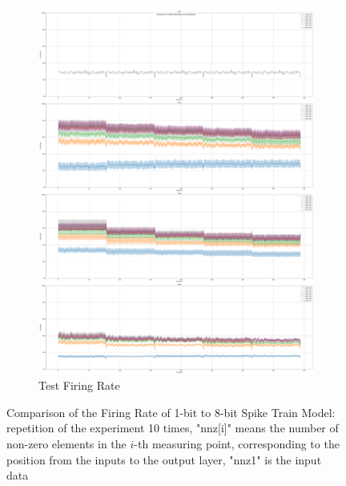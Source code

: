 \begin{figure}[!htpb]
\begin{subfigure}[H]{0.48\textwidth}
                \centering
                \includegraphics[width=\textwidth]{../standard/FashionMNIST/plots/fashionmnist_test_firerate.pdf}
                \caption{Test Firing Rate}
            \end{subfigure}
            \caption{Comparison of the Firing Rate of 1-bit to 8-bit Spike Train Model: repetition of the experiment 10 times, "nnz[i]" means the number of non-zero elements in the $i$-th measuring point, corresponding to the position from the inputs to the output layer, "nnz1" is the input data}
            \label{fig:firing_rate}
        \end{figure}

